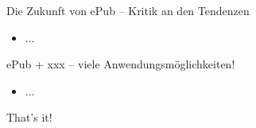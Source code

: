 \documentclass[hyperref={pdfpagelabels=false}]{beamer}
\begin{document}
\begin{frame}{Die Zukunft von ePub -- Kritik an den Tendenzen}
	\begin{itemize}
		\item ...
	\end{itemize}
\end{frame}

\begin{frame}{ePub + xxx -- viele Anwendungsmöglichkeiten!}
	\begin{itemize}
		\item ...
	\end{itemize}
\end{frame}


\begin{frame}[plain]
	That's it!
	\begin{center}
	\end{center}
\end{frame}


\end{document}
